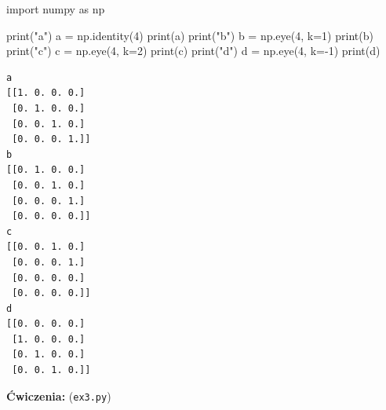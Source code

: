 \documentclass[
  polish,
  letterpaper,
  DIV=11,
  numbers=noendperiod]{scrreprt}
\newenvironment{Shaded}{\begin{snugshade}}{\end{snugshade}}
\newcommand{\BuiltInTok}[1]{\textcolor[rgb]{0.00,0.23,0.31}{#1}}
\newcommand{\DecValTok}[1]{\textcolor[rgb]{0.68,0.00,0.00}{#1}}
\newcommand{\ImportTok}[1]{\textcolor[rgb]{0.00,0.46,0.62}{#1}}
\newcommand{\NormalTok}[1]{\textcolor[rgb]{0.00,0.23,0.31}{#1}}
\newcommand{\OperatorTok}[1]{\textcolor[rgb]{0.37,0.37,0.37}{#1}}
\newcommand{\StringTok}[1]{\textcolor[rgb]{0.13,0.47,0.30}{#1}}
\begin{document}
\begin{Shaded}
\begin{Highlighting}[]
\ImportTok{import}\NormalTok{ numpy }\ImportTok{as}\NormalTok{ np}

\BuiltInTok{print}\NormalTok{(}\StringTok{"a"}\NormalTok{)}
\NormalTok{a }\OperatorTok{=}\NormalTok{ np.identity(}\DecValTok{4}\NormalTok{)}
\BuiltInTok{print}\NormalTok{(a)}
\BuiltInTok{print}\NormalTok{(}\StringTok{"b"}\NormalTok{)}
\NormalTok{b }\OperatorTok{=}\NormalTok{ np.eye(}\DecValTok{4}\NormalTok{, k}\OperatorTok{=}\DecValTok{1}\NormalTok{)}
\BuiltInTok{print}\NormalTok{(b)}
\BuiltInTok{print}\NormalTok{(}\StringTok{"c"}\NormalTok{)}
\NormalTok{c }\OperatorTok{=}\NormalTok{ np.eye(}\DecValTok{4}\NormalTok{, k}\OperatorTok{=}\DecValTok{2}\NormalTok{)}
\BuiltInTok{print}\NormalTok{(c)}
\BuiltInTok{print}\NormalTok{(}\StringTok{"d"}\NormalTok{)}
\NormalTok{d }\OperatorTok{=}\NormalTok{ np.eye(}\DecValTok{4}\NormalTok{, k}\OperatorTok{={-}}\DecValTok{1}\NormalTok{)}
\BuiltInTok{print}\NormalTok{(d)}
\end{Highlighting}
\end{Shaded}

\begin{verbatim}
a
[[1. 0. 0. 0.]
 [0. 1. 0. 0.]
 [0. 0. 1. 0.]
 [0. 0. 0. 1.]]
b
[[0. 1. 0. 0.]
 [0. 0. 1. 0.]
 [0. 0. 0. 1.]
 [0. 0. 0. 0.]]
c
[[0. 0. 1. 0.]
 [0. 0. 0. 1.]
 [0. 0. 0. 0.]
 [0. 0. 0. 0.]]
d
[[0. 0. 0. 0.]
 [1. 0. 0. 0.]
 [0. 1. 0. 0.]
 [0. 0. 1. 0.]]
\end{verbatim}

\textbf{Ćwiczenia:} (\texttt{ex3.py})
\end{document}
